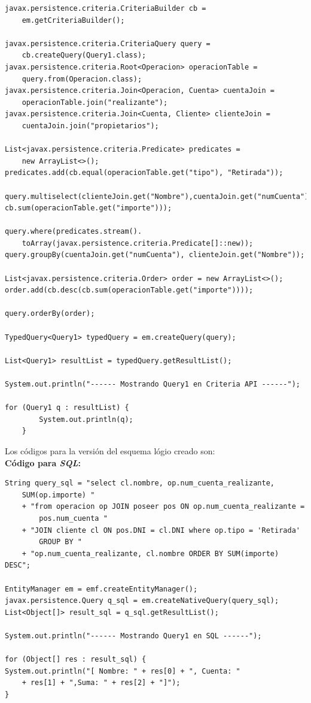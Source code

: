 \documentclass[11pt,a4paper]{article}
\begin{document}
\begin{lstlisting}
javax.persistence.criteria.CriteriaBuilder cb = 
	em.getCriteriaBuilder();

javax.persistence.criteria.CriteriaQuery query = 
	cb.createQuery(Query1.class);
javax.persistence.criteria.Root<Operacion> operacionTable = 
	query.from(Operacion.class);
javax.persistence.criteria.Join<Operacion, Cuenta> cuentaJoin = 
	operacionTable.join("realizante");
javax.persistence.criteria.Join<Cuenta, Cliente> clienteJoin = 
	cuentaJoin.join("propietarios");

List<javax.persistence.criteria.Predicate> predicates = 
	new ArrayList<>();
predicates.add(cb.equal(operacionTable.get("tipo"), "Retirada"));

query.multiselect(clienteJoin.get("Nombre"),cuentaJoin.get("numCuenta"),
cb.sum(operacionTable.get("importe")));

query.where(predicates.stream().
	toArray(javax.persistence.criteria.Predicate[]::new));
query.groupBy(cuentaJoin.get("numCuenta"), clienteJoin.get("Nombre"));

List<javax.persistence.criteria.Order> order = new ArrayList<>();
order.add(cb.desc(cb.sum(operacionTable.get("importe"))));

query.orderBy(order);

TypedQuery<Query1> typedQuery = em.createQuery(query);

List<Query1> resultList = typedQuery.getResultList();

System.out.println("------ Mostrando Query1 en Criteria API ------");

for (Query1 q : resultList) {
		System.out.println(q);
	}

\end{lstlisting}

\bigbreak

Los códigos para la versión del esquema lógio creado son:\\
\bigbreak
\textbf{Código para \textit{SQL}:}
\begin{lstlisting}
String query_sql = "select cl.nombre, op.num_cuenta_realizante, 
	SUM(op.importe) "
	+ "from operacion op JOIN poseer pos ON op.num_cuenta_realizante =
		pos.num_cuenta "
	+ "JOIN cliente cl ON pos.DNI = cl.DNI where op.tipo = 'Retirada' 
		GROUP BY "
	+ "op.num_cuenta_realizante, cl.nombre ORDER BY SUM(importe) DESC";

EntityManager em = emf.createEntityManager();
javax.persistence.Query q_sql = em.createNativeQuery(query_sql);
List<Object[]> result_sql = q_sql.getResultList();

System.out.println("------ Mostrando Query1 en SQL ------");

for (Object[] res : result_sql) {
System.out.println("[ Nombre: " + res[0] + ", Cuenta: " 
	+ res[1] + ",Suma: " + res[2] + "]");
}
\end{lstlisting}
\end{document}

